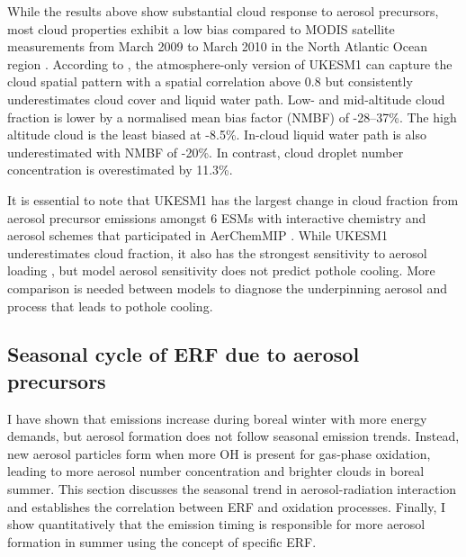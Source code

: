 While the results above show substantial cloud response to aerosol precursors, most cloud properties exhibit a low bias compared to MODIS satellite measurements from March 2009 to March 2010 in the North Atlantic Ocean region \citep{grosvenorDecompositionCloudAerosol2020}. According to \citet{grosvenorDecompositionCloudAerosol2020}, the atmosphere-only version of UKESM1 can capture the cloud spatial pattern with a spatial correlation above 0.8 but consistently underestimates cloud cover and liquid water path. Low- and mid-altitude cloud fraction is lower by a normalised mean bias factor (NMBF) of -28--37\%. The high altitude cloud is the least biased at -8.5\%. In-cloud liquid water path is also underestimated with NMBF of -20\%. In contrast, cloud droplet number concentration is overestimated by 11.3\%.


It is essential to note that UKESM1 has the largest change in cloud fraction from aerosol precursor emissions amongst 6 ESMs with interactive chemistry and aerosol schemes that participated in AerChemMIP \citep{zhangRoleAnthropogenicAerosols2021}. While UKESM1 underestimates cloud fraction, it also has the strongest sensitivity to aerosol loading \citep{zhangRoleAnthropogenicAerosols2021}, but model aerosol sensitivity does not predict pothole cooling. More comparison is needed between models to diagnose the underpinning aerosol and process that leads to pothole cooling. 


\subsection{Seasonal cycle of ERF due to aerosol precursors}


I have shown that  emissions increase during boreal winter with more energy demands, but aerosol formation does not follow seasonal emission trends. Instead, new  aerosol particles form when more OH is present for gas-phase oxidation, leading to more aerosol number concentration and brighter clouds in boreal summer. This section discusses the seasonal trend in aerosol-radiation interaction and establishes the correlation between ERF and oxidation processes. Finally, I show quantitatively that the emission timing is responsible for more aerosol formation in summer using the concept of specific ERF.



